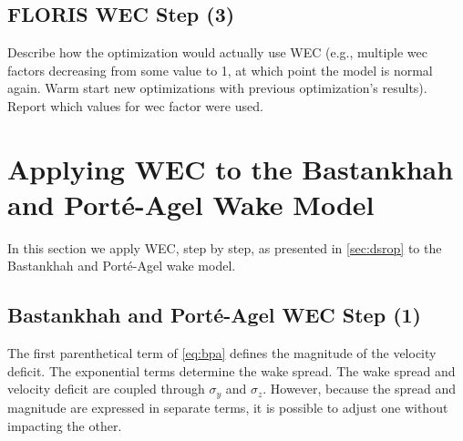 \documentclass[a4paper]{jpconf}
\begin{document}
\subsection{FLORIS WEC Step (3)}
Describe how the optimization would actually use WEC (e.g., multiple wec factors decreasing from some value to 1, at which point the model is normal again. Warm start new optimizations with previous optimization's results). Report which values for wec factor were used.

\section{Applying WEC to the Bastankhah and Port\'e-Agel Wake Model}
In this section we apply WEC, step by step, as presented in \cref{sec:dsrop} to the Bastankhah and Port\'e-Agel wake model.  

\subsection{Bastankhah and Port\'e-Agel WEC Step (1)}
The first parenthetical term of \cref{eq:bpa} defines the magnitude of the velocity deficit. The exponential terms determine the wake spread. The wake spread and velocity deficit are coupled through $\sigma_y$ and $\sigma_z$. However, because the spread and magnitude are expressed in separate terms, it is possible to adjust one without impacting the other. 
\end{document}
